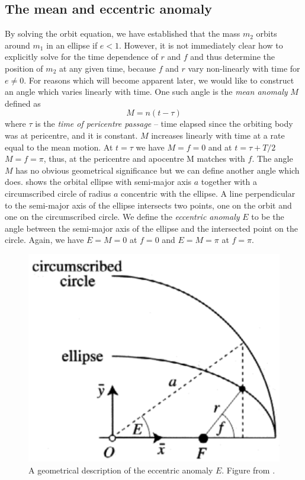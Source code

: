 \documentclass[twoside,openright,titlepage,numbers=noenddot,headinclude,%
                footinclude=true,cleardoublepage=empty,abstractoff, 
                BCOR=5mm,paper=a4,fontsize=11pt,%
                american,%
                ]{scrreprt}%
\begin{document}
\subsection{The mean and eccentric anomaly}
By solving the orbit equation, we have established that the mass $m_2$ orbits 
around $m_1$ in an ellipse if $e<1$. However, it is not immediately clear how
to explicitly solve for the time dependence of $r$ and $f$ and thus determine 
the position of $m_2$ at any given time, because $f$ and $r$ vary
non-linearly with time for $e\neq 0$. For reasons which will become apparent 
later, we would like to construct an angle which varies linearly with time.
One such angle is the \emph{mean anomaly} $M$ defined as
\begin{equation}
    M=n(t-\tau)
\label{eq:mean_anomaly}
\end{equation}
where $\tau$ is the \emph{time of pericentre passage} -- time elapsed
since the orbiting body was at pericentre, and it is constant. $M$
increases linearly with time at a rate equal to the mean motion. At $t=\tau$ 
we have $M=f=0$
and at $t=\tau + T/2$ $M=f=\pi$, thus, at the pericentre and apocentre 
M matches with $f$. The angle $M$ has no obvious geometrical significance
but we can define another angle which does.  
shows the orbital ellipse with semi-major axis $a$ together with a 
circumscribed circle of radius $a$ concentric with the ellipse. A line 
perpendicular to the semi-major axis of the ellipse intersects two points,
one on the orbit and one on the circumscribed circle. We define the 
\emph{eccentric anomaly} $E$ to be the angle between the semi-major axis
of the ellipse and the intersected point on the circle. Again, we have
$E=M=0$ at $f=0$ and $E=M=\pi$ at $f=\pi$. 
\begin{figure}[htb]
\centering
\includegraphics[width=0.5\linewidth]{gfx/eccentric_anomaly.png}
    \caption[Eccentric anomaly.]{A geometrical description of 
    the eccentric anomaly $E$. Figure from \citet{murray}.}
\label{fig:eccentric_anomaly}
\end{figure}
\end{document}
